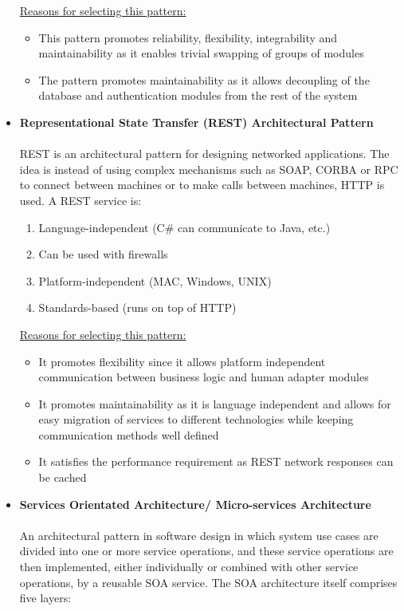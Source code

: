 \documentclass[a4paper,10pt]{article}
\begin{document}
\begin{itemize}
\begin{enumerate}
	\end{enumerate}
	\underline{Reasons for selecting this pattern:}
	\begin{itemize}
		\item This pattern promotes reliability, flexibility, integrability and maintainability as it enables trivial swapping of groups of modules
		\item The pattern promotes maintainability as it allows decoupling of the database and authentication modules from the rest of the system\\
	\end{itemize}
	\item \textbf {Representational State Transfer (REST) Architectural Pattern} \\\\
	REST is an architectural pattern for designing networked applications. The idea is instead of using complex mechanisms such as SOAP, CORBA or RPC to connect between machines or to make calls between machines, HTTP is used. A REST service is: 
	\begin{enumerate}
		\item Language-independent (C\# can communicate to Java, etc.)
		\item Can be used with firewalls
		\item Platform-independent (MAC, Windows, UNIX)
		\item Standards-based (runs on top of HTTP) \\
	\end{enumerate}
	\underline{Reasons for selecting this pattern:}
	\begin{itemize}
		\item It promotes flexibility since it allows platform independent communication between business logic and human adapter modules
		\item It promotes maintainability as it is language independent and allows for easy migration of services to different technologies while keeping communication methods well defined
		\item It satisfies the performance requirement as REST network responses can be cached\\
	\end{itemize}
	\item \textbf {Services Orientated Architecture/ Micro-services Architecture} \\\\
	An architectural pattern in software design in which system use cases are divided into one or more service operations, and these service operations are then implemented, either individually or combined with other service operations, by a reusable SOA service. The SOA architecture itself comprises five layers: 

\end{itemize}
\end{document}
